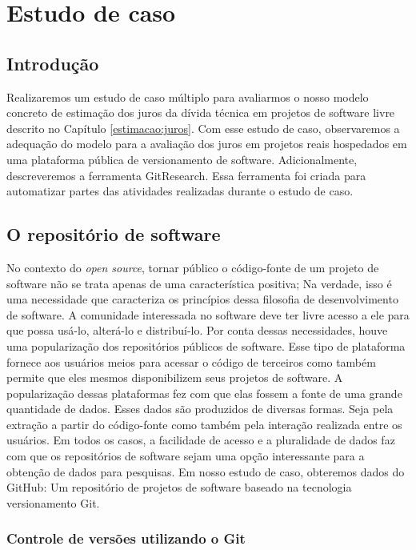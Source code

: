 \chapter{Estudo de caso}
\label{cap_estudo_caso}

\section{Introdução}

Realizaremos um estudo de caso múltiplo para avaliarmos o nosso modelo concreto de estimação dos juros da dívida técnica em projetos de software livre descrito no Capítulo \ref{estimacao:juros}.  Com esse estudo de caso, observaremos a adequação do modelo para a avaliação dos juros em projetos reais hospedados em uma plataforma pública de versionamento de software. Adicionalmente, descreveremos a ferramenta GitResearch. Essa ferramenta foi criada para automatizar partes das atividades realizadas durante o estudo de caso.

\section{O repositório de software}

No contexto do \textit{open source}, tornar público o código-fonte de um projeto de software não se trata apenas de uma característica positiva; Na verdade, isso é uma necessidade que caracteriza os princípios dessa filosofia de desenvolvimento de software. A comunidade interessada no software deve ter livre acesso a ele para que possa usá-lo, alterá-lo e distribuí-lo. Por conta dessas necessidades, houve uma popularização dos repositórios públicos de software. Esse tipo de plataforma fornece aos usuários meios para acessar o código  de terceiros como também permite que eles mesmos disponibilizem seus projetos de software. A popularização dessas plataformas fez com que elas fossem a fonte de uma grande quantidade de dados. Esses dados são produzidos de diversas formas. Seja pela extração a partir do código-fonte como também pela interação realizada entre os usuários.  Em todos os casos, a facilidade de acesso e a pluralidade de dados faz com que os repositórios de software sejam uma opção interessante para a obtenção de dados para pesquisas. Em nosso estudo de caso, obteremos dados do GitHub: Um repositório de projetos  de software baseado na tecnologia versionamento Git.



\subsection{Controle de versões utilizando o Git }


